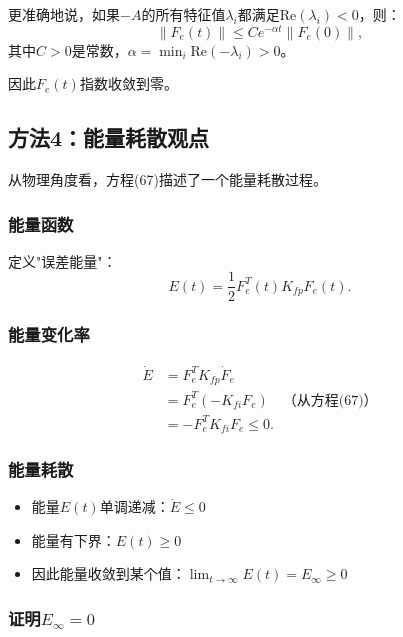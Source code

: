 \documentclass{article}
\begin{document}
更准确地说，如果$-A$的所有特征值$\lambda_i$都满足$\text{Re}(\lambda_i) < 0$，则：
\begin{equation}
\|F_e(t)\| \leq Ce^{-\alpha t}\|F_e(0)\|,
\end{equation}
其中$C > 0$是常数，$\alpha = \min_i \text{Re}(-\lambda_i) > 0$。

因此$F_e(t)$指数收敛到零。

\subsection{方法4：能量耗散观点}

从物理角度看，方程(67)描述了一个能量耗散过程。

\subsubsection{能量函数}

定义"误差能量"：
\begin{equation}
E(t) = \frac{1}{2}F_e^T(t)K_{fp}F_e(t).
\end{equation}

\subsubsection{能量变化率}

\begin{align}
\dot{E} &= F_e^T K_{fp}\dot{F}_e \\
        &= F_e^T(-K_{fi}F_e) \quad \text{（从方程(67)）} \\
        &= -F_e^T K_{fi}F_e \leq 0.
\end{align}

\subsubsection{能量耗散}

\begin{itemize}
\item 能量$E(t)$单调递减：$\dot{E} \leq 0$
\item 能量有下界：$E(t) \geq 0$
\item 因此能量收敛到某个值：$\lim_{t \to \infty} E(t) = E_{\infty} \geq 0$
\end{itemize}

\subsubsection{证明$E_{\infty} = 0$}
\end{document}
